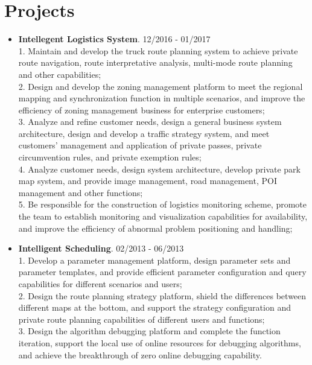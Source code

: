 \documentclass[letterpaper, UTF8]{article}
\begin{document}
	\section*{\textbf{Projects}}
	\begin{itemize}
		\item \textbf{Intellegent Logistics System}. 12/2016 - 01/2017\\
		1. Maintain and develop the truck route planning system to achieve private route navigation, route interpretative analysis, multi-mode route planning and other capabilities;\\
		2. Design and develop the zoning management platform to meet the regional mapping and synchronization function in multiple scenarios, and improve the efficiency of zoning management business for enterprise customers;\\
		3. Analyze and refine customer needs, design a general business system architecture, design and develop a traffic strategy system, and meet customers' management and application of private passes, private circumvention rules, and private exemption rules;\\
		4. Analyze customer needs, design system architecture, develop private park map system, and provide image management, road management, POI management and other functions;\\
		5. Be responsible for the construction of logistics monitoring scheme, promote the team to establish monitoring and visualization capabilities for availability, and improve the efficiency of abnormal problem positioning and handling;
		
		\item \textbf{Intelligent Scheduling}. 02/2013 - 06/2013\\
		1. Develop a parameter management platform, design parameter sets and parameter templates, and provide efficient parameter configuration and query capabilities for different scenarios and users;\\
		2. Design the route planning strategy platform, shield the differences between different maps at the bottom, and support the strategy configuration and private route planning capabilities of different users and functions; \\
		3. Design the algorithm debugging platform and complete the function iteration, support the local use of online resources for debugging algorithms, and achieve the breakthrough of zero online debugging capability.
		

\end{itemize}
\end{document}
